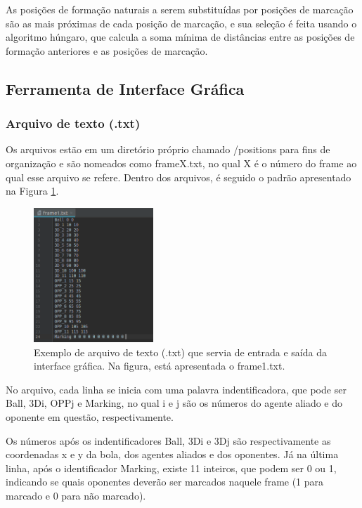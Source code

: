 \documentclass[a4paper,12pt]{article}
\begin{document}
As posições de formação naturais a serem substituídas por posições de marcação são as mais próximas de cada posição de marcação, e sua seleção é feita usando o algoritmo húngaro, que calcula a soma mínima de distâncias entre as posições de formação anteriores e as posições de marcação.

\subsection{Ferramenta de Interface Gráfica}
\subsubsection{Arquivo de texto (.txt)}
Os arquivos estão em um diretório próprio chamado /positions para fins de organização e são nomeados como frameX.txt, no qual X é o número do frame ao qual esse arquivo se refere. Dentro dos arquivos, é seguido o padrão apresentado na Figura \ref{fig:frame1-txt}.

\begin{figure}[H]
	\centering
	\includegraphics[width=0.4\textwidth]{figures/frame1-txt.png}
   \caption{Exemplo de arquivo de texto (.txt) que servia de entrada e saída da interface gráfica. Na figura, está apresentada o frame1.txt.} \label{fig:frame1-txt}
\end{figure}

No arquivo, cada linha se inicia com uma palavra indentificadora, que pode ser Ball, 3D\underline{\space}i, OPP\underline{\space}j e Marking, no qual i e j são os números do agente aliado e do oponente em questão, respectivamente.

Os números após os indentificadores Ball, 3D\underline{\space}i e 3D\underline{\space}j são respectivamente as coordenadas x e y da bola, dos agentes aliados e dos oponentes. Já na última linha, após o identificador Marking, existe 11 inteiros, que podem ser 0 ou 1, indicando se quais oponentes deverão ser marcados naquele frame (1 para marcado e 0 para não marcado).
\end{document}

